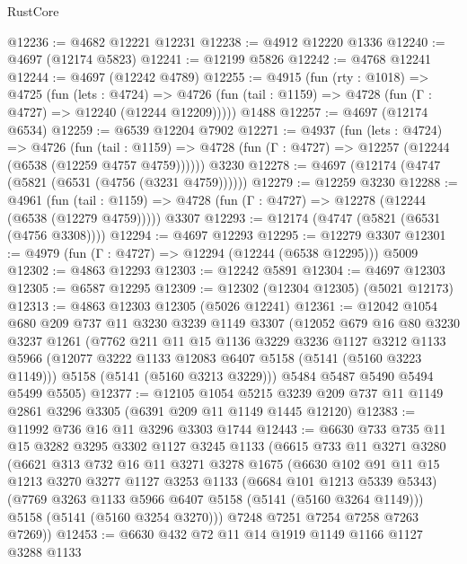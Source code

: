 \begin{lexlean}{RustCore}
\begin{coremodule}
@12236 := @4682 @12221 @12231
@12238 := @4912 @12220 @1336
@12240 := @4697 (@12174 @5823)
@12241 := @12199 @5826
@12242 := @4768 @12241
@12244 := @4697 (@12242 @4789)
@12255 := @4915
    (fun (rty : @1018) =>
    @4725
      (fun (lets : @4724) =>
      @4726 (fun (tail : @1159) => @4728 (fun (Γ : @4727) => @12240 (@12244 @12209)))))
    @1488
@12257 := @4697 (@12174 @6534)
@12259 := @6539 @12204 @7902
@12271 := @4937
    (fun (lets : @4724) =>
    @4726
      (fun (tail : @1159) =>
      @4728 (fun (Γ : @4727) => @12257 (@12244 (@6538 (@12259 @4757 @4759))))))
    @3230
@12278 := @4697 (@12174 (@4747 (@5821 (@6531 (@4756 (@3231 @4759))))))
@12279 := @12259 @3230
@12288 := @4961
    (fun (tail : @1159) => @4728 (fun (Γ : @4727) => @12278 (@12244 (@6538 (@12279 @4759)))))
    @3307
@12293 := @12174 (@4747 (@5821 (@6531 (@4756 @3308))))
@12294 := @4697 @12293
@12295 := @12279 @3307
@12301 := @4979 (fun (Γ : @4727) => @12294 (@12244 (@6538 @12295))) @5009
@12302 := @4863 @12293
@12303 := @12242 @5891
@12304 := @4697 @12303
@12305 := @6587 @12295
@12309 := @12302 (@12304 @12305) (@5021 @12173)
@12313 := @4863 @12303 @12305 (@5026 @12241)
@12361 := @12042
    @1054
    @680
    @209
    @737
    @11
    @3230
    @3239
    @1149
    @3307
    (@12052
      @679
      @16
      @80
      @3230
      @3237
      @1261
      (@7762
        @211
        @11
        @15
        @1136
        @3229
        @3236
        @1127
        @3212
        @1133
        @5966
        (@12077 @3222 @1133 @12083 @6407 @5158 (@5141 (@5160 @3223 @1149)))
        @5158
        (@5141 (@5160 @3213 @3229)))
      @5484
      @5487
      @5490
      @5494
      @5499
      @5505)
@12377 := @12105
    @1054
    @5215
    @3239
    @209
    @737
    @11
    @1149
    @2861
    @3296
    @3305
    (@6391 @209 @11 @1149 @1445 @12120)
@12383 := @11992 @736 @16 @11 @3296 @3303 @1744
@12443 := @6630
    @733
    @735
    @11
    @15
    @3282
    @3295
    @3302
    @1127
    @3245
    @1133
    (@6615
      @733
      @11
      @3271
      @3280
      (@6621
        @313
        @732
        @16
        @11
        @3271
        @3278
        @1675
        (@6630
          @102
          @91
          @11
          @15
          @1213
          @3270
          @3277
          @1127
          @3253
          @1133
          (@6684 @101 @1213 @5339 @5343)
          (@7769 @3263 @1133 @5966 @6407 @5158 (@5141 (@5160 @3264 @1149)))
          @5158
          (@5141 (@5160 @3254 @3270)))
        @7248
        @7251
        @7254
        @7258
        @7263
        @7269))
@12453 := @6630 @432 @72 @11 @14 @1919 @1149 @1166 @1127 @3288 @1133

\end{coremodule}
\end{lexlean}
